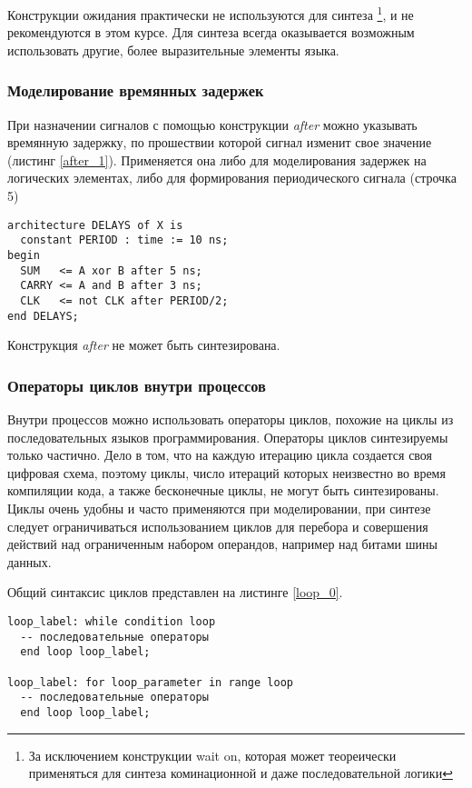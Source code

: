 Конструкции ожидания практически не используются для синтеза \footnote{За исключением конструкции wait on, которая может теореически применяться для синтеза коминационной и даже последовательной логики}, и не рекомендуются в этом курсе. Для синтеза всегда оказывается возможным использовать другие, более выразительные элементы языка.

\subsubsection{Моделирование времянных задержек}

При назначении сигналов с помощью конструкции \emph{after} можно указывать времянную задержку, по прошествии которой сигнал изменит свое значение (листинг \ref{after_1}). Применяется она либо для моделирования задержек на логических элементах, либо для формирования периодического сигнала (строчка 5)

\begin{Code}
\begin{lstlisting}[caption=Назначение сигналов с задержкой, label=after_1]
architecture DELAYS of X is
  constant PERIOD : time := 10 ns;
begin
  SUM   <= A xor B after 5 ns;
  CARRY <= A and B after 3 ns;
  CLK   <= not CLK after PERIOD/2;
end DELAYS;
\end{lstlisting}
\end{Code}

Конструкция \emph{after} не может быть синтезирована.

\subsubsection{Операторы циклов внутри процессов}

Внутри процессов можно использовать операторы циклов, похожие на циклы из последовательных языков программирования. Операторы циклов синтезируемы только частично. Дело в том, что на каждую итерацию цикла создается своя цифровая схема, поэтому циклы, число итераций которых неизвестно во время компиляции кода, а также бесконечные циклы, не могут быть синтезированы. Циклы очень удобны и часто применяются при моделировании, при синтезе следует ограничиваться использованием циклов для перебора и совершения действий над ограниченным набором операндов, например над битами шины данных.

Общий синтаксис циклов представлен на листинге \ref{loop_0}.

\begin{Code}
\begin{lstlisting}[caption=Синтаксис циклов, label=loop_0]
loop_label: while condition loop
  -- последовательные операторы
  end loop loop_label;

loop_label: for loop_parameter in range loop
  -- последовательные операторы
  end loop loop_label;
\end{lstlisting}
\end{Code}

